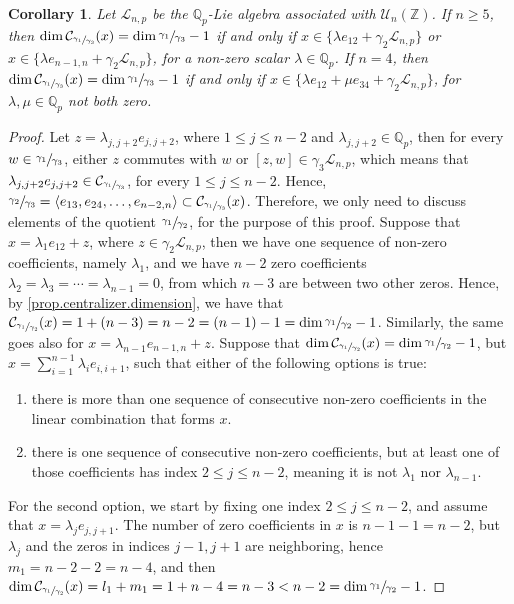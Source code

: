\documentclass[12pt]{article}
\newtheorem{corollary}[theorem]{Corollary}
\begin{document}
\begin{corollary}
\label{prop.n.geq.4.centralizer.codimension}
Let $\mathcal{L}_{n,p}$ be the $\mathbb{Q}_p$-Lie algebra associated with $\mathcal{U}_n(\mathbb{Z})$. If $n\geq 5$, then $\dim\mathcal{C}_{\sfrac{\gamma_1}{\gamma_3}}(x)=\dim\sfrac{\gamma_1}{\gamma_3}-1$ if and only if $x\in\{\lambda e_{12}+\gamma_2\mathcal{L}_{n,p}\}$ or $x\in\{\lambda e_{n-1,n}+\gamma_2\mathcal{L}_{n,p}\}$, for a non-zero scalar $\lambda\in\mathbb{Q}_p$. If $n=4$, then $\dim\mathcal{C}_{\sfrac{\gamma_1}{\gamma_3}}(x)=\dim\sfrac{\gamma_1}{\gamma_3}-1$ if and only if $x\in\{\lambda e_{12}+\mu e_{34}+\gamma_2\mathcal{L}_{n,p}\}$, for $\lambda,\mu\in\mathbb{Q}_p$ not both zero.
\end{corollary}
\begin{proof}
Let $z=\lambda_{j,j+2}e_{j,j+2}$, where $1\leq j\leq n-2$ and $\lambda_{j,j+2}\in\mathbb{Q}_p$, then for every $w\in\sfrac{\gamma_1}{\gamma_3}$, either $z$ commutes with $w$ or $[z,w]\in\gamma_3\mathcal{L}_{n,p}$, which means that $\lambda_{j,j+2}e_{j,j+2}\in\mathcal{C}_{\sfrac{\gamma_1}{\gamma_3}}$, for every $1\leq j\leq n-2$. Hence, $\sfrac{\gamma_2}{\gamma_3}=\langle e_{13},e_{24},\dots,e_{n-2,n}\rangle\subset\mathcal{C}_{\sfrac{\gamma_1}{\gamma_3}}(x)$. Therefore, we only need to discuss elements of the quotient $\sfrac{\gamma_1}{\gamma_2}$, for the purpose of this proof.
Suppose that $x=\lambda_1 e_{12}+z$, where $z\in\gamma_2 \mathcal{L}_{n,p}$, then we have one sequence of non-zero coefficients, namely $\lambda_1$, and we have $n-2$ zero coefficients $\lambda_2=\lambda_3=\cdots=\lambda_{n-1}=0$, from which $n-3$ are between two other zeros. Hence, by \ref{prop.centralizer.dimension}, we have that $\mathcal{C}_{\sfrac{\gamma_1}{\gamma_2}}(x)=1+(n-3)=n-2=(n-1)-1=\dim\sfrac{\gamma_1}{\gamma_2}-1$. Similarly, the same goes also for $x=\lambda_{n-1}e_{n-1,n}+z$.
Suppose that $\dim\mathcal{C}_{\sfrac{\gamma_1}{\gamma_2}}(x)=\dim\sfrac{\gamma_1}{\gamma_2}-1$, but $x=\sum_{i=1}^{n-1}\lambda_i e_{i,i+1}$, such that either of the following options is true:
\begin{enumerate}
  \item there is more than one sequence of consecutive non-zero coefficients in the linear combination that forms $x$.
  \item there is one sequence of consecutive non-zero coefficients, but at least one of those coefficients has index $2\leq j\leq n-2$, meaning it is not $\lambda_1$ nor $\lambda_{n-1}$.
\end{enumerate}
For the second option, we start by fixing one index $2\leq j\leq n-2$, and assume that $x=\lambda_j e_{j,j+1}$. The number of zero coefficients in $x$ is $n-1-1=n-2$, but $\lambda_j$ and the zeros in indices $j-1,j+1$ are neighboring, hence $m_1=n-2-2=n-4$, and then $\dim\mathcal{C}_{\sfrac{\gamma_1}{\gamma_2}}(x)=l_1+m_1=1+n-4=n-3<n-2=\dim\sfrac{\gamma_1}{\gamma_2}-1$.

\end{proof}
\end{document}
